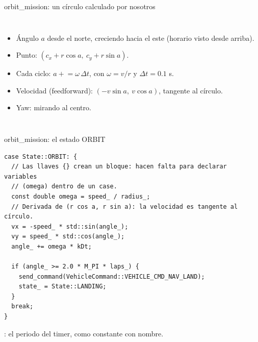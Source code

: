 \begin{frame}{orbit\_mission: un círculo calculado por nosotros}
  \begin{columns}[c]
    \centering
    \small
    \begin{itemize}
      \item Ángulo $a$ desde el norte, creciendo hacia el este (horario visto desde arriba).
      \item Punto: $(c_x + r\cos a,\ c_y + r\sin a)$.
      \item Cada ciclo: $a \mathrel{+}= \omega\,\Delta t$, con $\omega = v / r$ y $\Delta t = 0.1$ s.
      \item Velocidad (feedforward): $(-v\sin a,\ v\cos a)$, tangente al círculo.
      \item Yaw: mirando al centro.
    \end{itemize}
  \end{columns}
\end{frame}

\begin{frame}[fragile]{orbit\_mission: el estado ORBIT}
  \begin{lstlisting}[style=cpp,caption={orbit\_mission.cpp}]
case State::ORBIT: {
  // Las llaves {} crean un bloque: hacen falta para declarar variables
  // (omega) dentro de un case.
  const double omega = speed_ / radius_;
  // Derivada de (r cos a, r sin a): la velocidad es tangente al círculo.
  vx = -speed_ * std::sin(angle_);
  vy = speed_ * std::cos(angle_);
  angle_ += omega * kDt;

  if (angle_ >= 2.0 * M_PI * laps_) {
    send_command(VehicleCommand::VEHICLE_CMD_NAV_LAND);
    state_ = State::LANDING;
  }
  break;
}
  \end{lstlisting}
  \small {}: el periodo del timer, como constante con nombre.
\end{frame}

